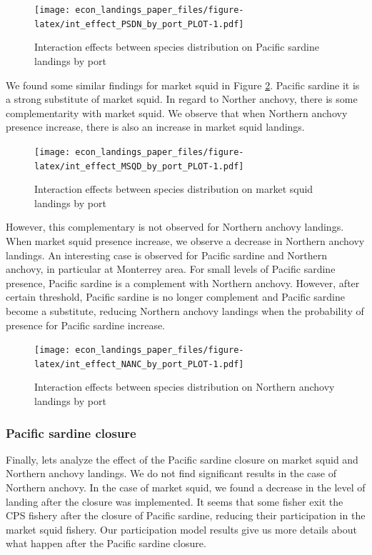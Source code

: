 \documentclass[
]{article}
\begin{document}
\begin{figure}
\centering
\texttt{[image: econ\_landings\_paper\_files/figure-latex/int\_effect\_PSDN\_by\_port\_PLOT-1.pdf]}
\caption{Interaction effects between species distribution on Pacific
sardine landings by port\label{fig:sdm_int_psdn}}
\end{figure}

We found some similar findings for market squid in Figure
\ref{fig:sdm_int_msqd}. Pacific sardine it is a strong substitute of
market squid. In regard to Norther anchovy, there is some
complementarity with market squid. We observe that when Northern anchovy
presence increase, there is also an increase in market squid landings.

\begin{figure}
\centering
\texttt{[image: econ\_landings\_paper\_files/figure-latex/int\_effect\_MSQD\_by\_port\_PLOT-1.pdf]}
\caption{Interaction effects between species distribution on market
squid landings by port\label{fig:sdm_int_msqd}}
\end{figure}

However, this complementary is not observed for Northern anchovy
landings. When market squid presence increase, we observe a decrease in
Northern anchovy landings. An interesting case is observed for Pacific
sardine and Northern anchovy, in particular at Monterrey area. For small
levels of Pacific sardine presence, Pacific sardine is a complement with
Northern anchovy. However, after certain threshold, Pacific sardine is
no longer complement and Pacific sardine become a substitute, reducing
Northern anchovy landings when the probability of presence for Pacific
sardine increase.

\begin{figure}
\centering
\texttt{[image: econ\_landings\_paper\_files/figure-latex/int\_effect\_NANC\_by\_port\_PLOT-1.pdf]}
\caption{Interaction effects between species distribution on Northern
anchovy landings by port\label{fig:sdm_int_nanc}}
\end{figure}

\hypertarget{pacific-sardine-closure}{%
\subsubsection{Pacific sardine closure}\label{pacific-sardine-closure}}

Finally, lets analyze the effect of the Pacific sardine closure on
market squid and Northern anchovy landings. We do not find significant
results in the case of Northern anchovy. In the case of market squid, we
found a decrease in the level of landing after the closure was
implemented. It seems that some fisher exit the CPS fishery after the
closure of Pacific sardine, reducing their participation in the market
squid fishery. Our participation model results give us more details
about what happen after the Pacific sardine closure.
\end{document}
